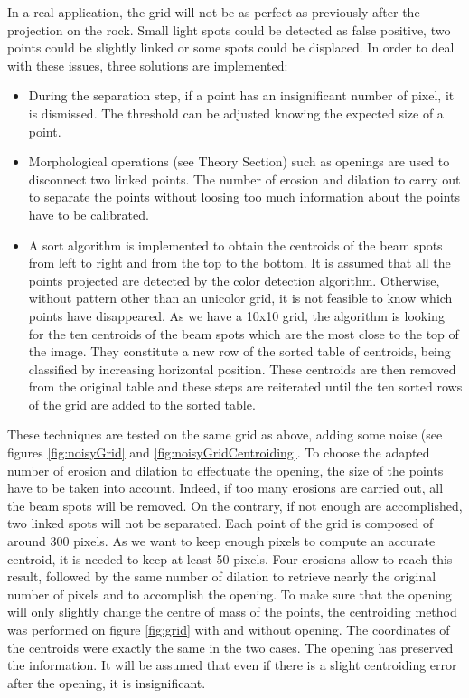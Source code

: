 In a real application, the grid will not be as perfect as previously after the projection on the rock. Small light spots could be detected as false positive, two points could be slightly linked or some spots could be displaced. In order to deal with these issues, three solutions are implemented: 
\begin{itemize}
\item During the separation step, if a point has an insignificant number of pixel, it is dismissed. The threshold can be adjusted knowing the expected size of a point. 
\item Morphological operations (see Theory Section) such as openings are used to disconnect two linked points. The number of erosion and dilation to carry out to separate the points without loosing too much information about the points have to be calibrated. 
\item A sort algorithm is implemented to obtain the centroids of the beam spots from left to right and from the top to the bottom. It is assumed that all the points projected are detected by the color detection algorithm. Otherwise, without pattern other than an unicolor grid, it is not feasible to know which points have disappeared. As we have a 10x10 grid, the algorithm is looking for the ten centroids of the beam spots which are the most close to the top of the image. They constitute a new row of the sorted table of centroids, being classified by increasing horizontal position. These centroids are then removed from the original table and these steps are reiterated until the ten sorted rows of the grid are added to the sorted table.
\end{itemize}

These techniques are tested on the same grid as above, adding some noise (see figures \ref{fig:noisyGrid} and \ref{fig:noisyGridCentroiding}. To choose the adapted number of erosion and dilation to effectuate the opening, the size of the points have to be taken into account. Indeed, if too many erosions are carried out, all the beam spots will be removed. On the contrary, if not enough are accomplished, two linked spots will not be separated. Each point of the grid is composed of around 300 pixels.  As we want to keep enough pixels to compute an accurate centroid, it is needed to keep at least 50 pixels. Four erosions allow to reach this result, followed by the same number of dilation to retrieve nearly the original number of pixels and to accomplish the opening. To make sure that the opening will only slightly change the centre of mass of the points, the centroiding method was performed on figure \ref{fig:grid} with and without opening. The coordinates of the centroids were exactly the same in the two cases. The opening has preserved the information. It will be assumed that even if there is a slight centroiding error after the opening, it is insignificant.

